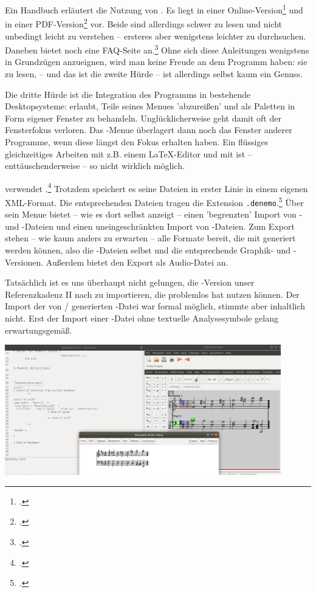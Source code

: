 Ein Handbuch erläutert die Nutzung von . Es liegt in einer
Online-Version\footcite[vgl.][\nopage wp]{Shann2015a} und in einer
PDF-Version\footcite[vgl.][2ff]{Shann2015b} vor. Beide sind allerdings schwer zu
lesen und nicht unbedingt leicht zu verstehen -- ersteres aber wenigstens leichter
zu durchsuchen. Daneben bietet  noch eine FAQ-Seite
an.\footcite[vgl.][\nopage wp]{Denemo2019c} Ohne sich diese Anleitungen
wenigstens in Grundzügen anzueignen, wird man keine Freude an dem Programm
haben: sie zu lesen, -- und das ist die zweite Hürde -- ist allerdings selbst
kaum ein Genuss.

Die dritte Hürde ist die Integration des Programms in bestehende Desktopsysteme:
 erlaubt, Teile seines Menues 'abzureißen' und als Paletten in Form
eigener Fenster zu behandeln. Unglücklicherweise geht damit oft der Fensterfokus
verloren. Das -Menue überlagert dann noch das Fenster anderer
Programme, wenn diese längst den Fokus erhalten haben. Ein flüssiges
gleichzeitiges Arbeiten mit z.B. einem \LaTeX-Editor und mit  ist
-- enttäuschenderweise -- so nicht wirklich möglich.

 verwendet .\footcite[vgl.][\nopage
wp]{Denemo2019b} Trotzdem speichert es seine Dateien in erster Linie in einem
eigenen XML-Format. Die entsprechenden Dateien tragen die Extension
\texttt{.denemo}.\footcite[vgl. dazu][\nopage wp]{WpedDenemo2018a} Über sein
Menue bietet  -- wie es dort selbst anzeigt -- einen 'begrenzten'
Import von - und -Dateien und einen uneingeschränkten
Import von -Dateien. Zum Export stehen -- wie kaum anders zu
erwarten -- alle Formate bereit, die mit  generiert werden können,
also die -Dateien selbst und die entsprechende Graphik- und
-Versionen. Außerdem bietet  den Export als Audio-Datei an.

Tatsächlich ist es uns überhaupt nicht gelungen, die -Version
unser Referenzkadenz II nach   zu importieren, die 
problemlos hat nutzen können. Der Import der von  /
 generierten -Datei war formal möglich, stimmte aber
inhaltlich nicht. Erst der Import einer -Datei ohne textuelle
Analysesymbole gelang erwartungsgemäß.

\begin{center}
\includegraphics[width=0.9\textwidth]{frontends/denemo/denemo-cadenca2-300dpi.png}
\end{center}

